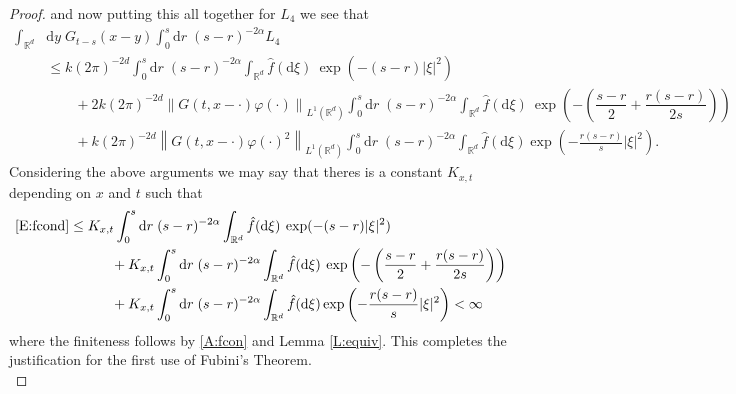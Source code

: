 \documentclass[a4paper,11pt]{article}%
\numberwithin{equation}{section}
\theoremstyle{plain}
\theoremstyle{definition}
\newcommand{\R}{\mathbb{R}}
\newcommand{\Norm}[1]{\left\|  #1   \right\|}
\newcommand{\ud}{\ensuremath{ \mathrm{d} }}
\begin{document}
\begin{proof}
and now putting this all together for $L_4$ we see that
\begin{align*}
\int_{\R^d}& \ud y \;G_{t-s}(x-y)\int_0^s\ud r\; (s-r)^{-2\alpha}L_4
\\ &\le k (2\pi)^{-2d}\int_0^s\ud r\; (s-r)^{-2\alpha}\int_{\R^d}\hat f (\ud \xi)\: \exp(-(s-r)|\xi|^2)
\\&\hspace{2em}+ 2 k  (2\pi)^{-2d} \Norm{G(t,x-\cdot)\varphi(\cdot)}_{L^1(\R^d)}\int_0^s\ud r\; (s-r)^{-2\alpha}\int_{\R^d}\hat f(\ud \xi) \: \exp\left(-\left(\dfrac{s-r}{2}+\dfrac{r(s-r)}{2s}\right)\right)
\\&\hspace{2em} + k (2\pi)^{-2d}  \Norm{G(t,x-\cdot)\varphi(\cdot)^2}_{L^1(\R^d)} \int_0^s\ud r\; (s-r)^{-2\alpha}\int_{\R^d} \hat{f}(\ud \xi)\exp\left(-\frac{r(s-r)}{s}|\xi|^2\right).
\end{align*}
Considering the above arguments we may say that theres is a constant $K_{x,t}$ depending on $x$ and $t$ such that
\begin{align*}
\eqref{E:fcond} &\le K_{x,t}\int_0^s\ud r\; (s-r)^{-2\alpha}\int_{\R^d}\hat f (\ud \xi)\: \exp(-(s-r)|\xi|^2)
\\&\hspace{3em}+ K_{x,t}\int_0^s\ud r\; (s-r)^{-2\alpha}\int_{\R^d}\hat f(\ud \xi) \: \exp\left(-\left(\dfrac{s-r}{2}+\dfrac{r(s-r)}{2s}\right)\right)
\\&\hspace{3em} + K_{x,t}\int_0^s\ud r\; (s-r)^{-2\alpha}\int_{\R^d} \hat{f}(\ud \xi)\exp\left(-\frac{r(s-r)}{s}|\xi|^2\right) < \infty
\end{align*}
where the finiteness follows by \eqref{A:fcon} and Lemma \ref{L:equiv}. This completes the justification for the first use of Fubini's Theorem. \\
\end{proof}
\end{document}
